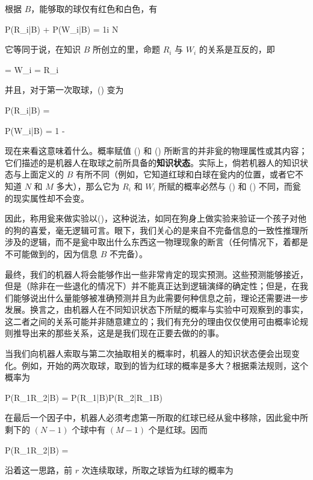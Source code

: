 根据 $B$，能够取的球仅有红色和白色，有

\placeformula[3-6]
\startformula
P(R_i|B) + P(W_i|B) = 1\quad{}\le i \le N
\stopformula

它等同于说，在知识 $B$ 所创立的里，命题 $R_i$ 与 $W_i$ 的关系是互反的，即

\placeformula[3-7]
\startformula
{} = W_i\quad\quad {} = R_i
\stopformula

并且，对于第一次取球，(\in[3-5]) 变为

\placeformula[3-8]
\startformula
P(R_i|B) = 
\stopformula

\placeformula[3-9]
\startformula
P(W_i|B) = 1 - 
\stopformula

现在来看这意味着什么。概率赋值 (\in[3-8]) 和 (\in[3-9]) 所断言的并非瓮的物理属性或其内容；它们描述的是机器人在取球之前所具备的{\bf 知识状态}。实际上，倘若机器人的知识状态与上面定义的 $B$ 有所不同（例如，它知道红球和白球在瓮内的位置，或者它不知道 $N$ 和 $M$ 多大），那么它为 $R_i$ 和 $W_i$ 所赋的概率必然与 (\in[3-8]) 和 (\in[3-9]) 不同，而瓮的现实属性却不会变。

因此，称用瓮来做实验以(\in[3-8])，这种说法，如同在狗身上做实验来验证一个孩子对他的狗的喜爱，毫无逻辑可言。眼下，我们关心的是来自不完备信息的一致性推理所涉及的逻辑，而不是瓮中取出什么东西这一物理现象的断言（任何情况下，着都是不可能做到的，因为信息 $B$ 不完备）。

最终，我们的机器人将会能够作出一些非常肯定的现实预测。这些预测能够接近，但是（除非在一些退化的情况下）并不能真正达到逻辑演绎的确定性；但是，在我们能够说出什么量能够被准确预测并且为此需要何种信息之前，理论还需要进一步发展。换言之，由机器人在不同知识状态下所赋的概率与实验中可观察到的事实，这二者之间的关系可能并非随意建立的；我们有充分的理由仅仅使用可由概率论规则推导出来的那些关系，这是是我们现在正要去做的的事。

当我们向机器人索取与第二次抽取相关的概率时，机器人的知识状态便会出现变化。例如，开始的两次取球，取到的皆为红球的概率是多大？根据乘法规则，这个概率为

\placeformula[3-10]
\startformula
P(R_1R_2|B) = P(R_1|B)P(R_2|R_1B)
\stopformula

在最后一个因子中，机器人必须考虑第一所取的红球已经从瓮中移除，因此瓮中所剩下的 $(N - 1)$ 个球中有 $(M - 1)$ 个是红球。因而

\placeformula[3-11]
\startformula
P(R_1R_2|B) = 
\stopformula

沿着这一思路，前 $r$ 次连续取球，所取之球皆为红球的概率为

